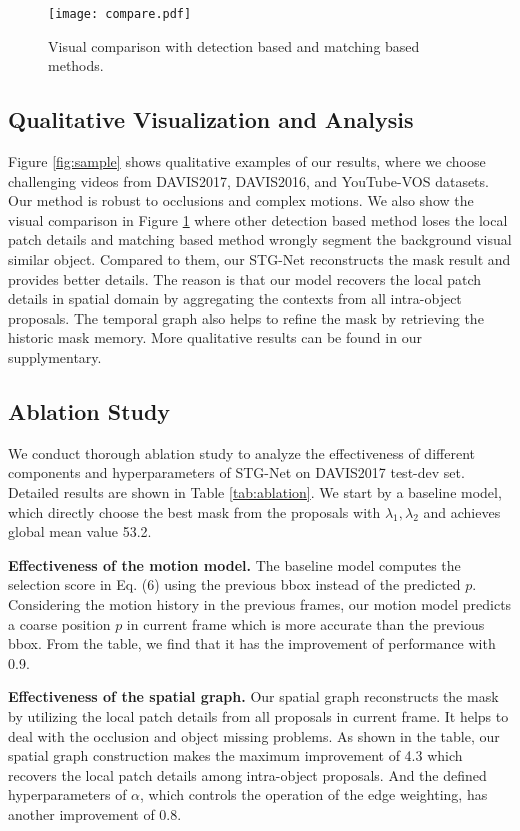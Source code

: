 \documentclass[letterpaper]{article} \usepackage{aaai21}  \usepackage{times}  \usepackage{helvet} \usepackage{courier}  \usepackage[hyphens]{url}  \usepackage{graphicx} \urlstyle{rm} \def\UrlFont{\rm}  \usepackage{graphicx}  \usepackage{natbib}  \usepackage{caption} \frenchspacing  \setlength{\pdfpagewidth}{8.5in}  \setlength{\pdfpageheight}{11in}  \usepackage{amsmath}
\begin{document}
\begin{figure}[t]
\centering
\texttt{[image: compare.pdf]}
\caption{Visual comparison with detection based \cite{luiten2018premvos} and matching based \cite{voigtlaender2019feelvos} methods.}
\label{fig:compare}
\vspace{-12pt}
\end{figure}

\subsection{Qualitative Visualization and Analysis}
Figure \ref{fig:sample} shows qualitative examples of our results, where we choose challenging videos from DAVIS2017, DAVIS2016, and YouTube-VOS datasets. Our method is robust to occlusions and complex motions. We also show the visual comparison in Figure \ref{fig:compare} where other detection based method loses the local patch details and matching based method wrongly segment the background visual similar object. Compared to them, our STG-Net reconstructs the mask result and provides better details. The reason is that our model recovers the local patch details in spatial domain by aggregating the contexts from all intra-object proposals. The temporal graph also helps to refine the mask by retrieving the historic mask memory. More qualitative results can be found in our supplymentary.

\subsection{Ablation Study}
We conduct thorough ablation study to analyze the effectiveness of different components and hyperparameters of STG-Net on DAVIS2017 test-dev set. Detailed results are shown in Table \ref{tab:ablation}. We start by a baseline model, which directly choose the best mask from the proposals with $\lambda_1,\lambda_2$ and achieves global mean value 53.2. 

\noindent \textbf{Effectiveness of the motion model.}
The baseline model computes the selection score in Eq. (6) using the previous bbox instead of the predicted $p$.
Considering the motion history in the previous frames, our motion model predicts a coarse position $p$ in current frame which is more accurate than the previous bbox. From the table, we find that it has the improvement of performance with 0.9.

\noindent \textbf{Effectiveness of the spatial graph.}
Our spatial graph reconstructs the mask by utilizing the local patch details from all proposals in current frame. It helps to deal with the occlusion and object missing problems. As shown in the table, our spatial graph construction makes the maximum improvement of 4.3 which recovers the local patch details among intra-object proposals. And the defined hyperparameters of $\alpha$, which controls the operation of the edge weighting, has another improvement of 0.8.
\end{document}
